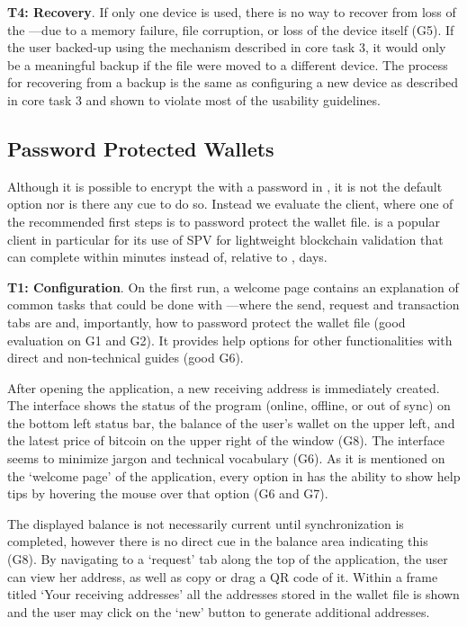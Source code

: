\textbf{T4: Recovery}.
If only one device is used, there is no way to recover from loss of the \walletfile---\eg due to a memory failure, file corruption, or loss of the device itself (G5). If the user backed-up \walletfile using the mechanism described in core task 3, it would only be a meaningful backup if the file were moved to a different device. The process for recovering from a backup is the same as configuring a new device as described in core task 3 and shown to violate most of the usability guidelines.


\subsection{Password Protected Wallets}
Although it is possible to encrypt the \walletfile with a password in \bitcoinclient, it is not the default option nor is there any cue to do so. Instead we evaluate the \multibit client, where one of the recommended first steps is to password protect the wallet file. \multibit is a popular client in particular for its use of SPV for lightweight blockchain validation that can complete within minutes instead of, relative to \bitcoinclient, days.

\textbf{T1: Configuration}.
On the first run, a welcome page contains an explanation of common tasks that could be done with \multibit---where the send, request and transaction tabs are and, importantly, how to password protect the wallet file (good evaluation on G1 and G2). It provides help options for other functionalities with direct and non-technical guides (good G6). 

After opening the application, a new receiving address is immediately created. The interface shows the status of the program (online, offline, or out of sync) on the bottom left status bar, the balance of the user's wallet on the upper left, and the latest price of bitcoin on the upper right of the window (G8). The interface seems to minimize jargon and technical vocabulary (G6). As it is mentioned on the `welcome page' of the application, every option in \multibit has the ability to show help tips by hovering the mouse over that option (G6 and G7).

The displayed balance is not necessarily current until synchronization is completed, however there is no direct cue in the balance area indicating this (G8). By navigating to a `request' tab along the top of the application, the user can view her address, as well as copy or drag a QR code of it. Within a frame titled `Your receiving addresses' all the addresses stored in the wallet file is shown and the user may click on the `new' button to generate additional addresses. 

